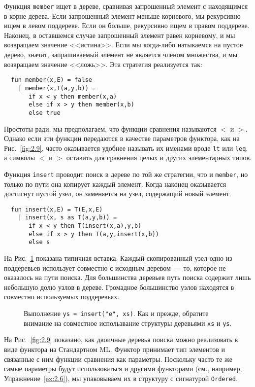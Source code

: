 Функция \lstinline!member! ищет в дереве, сравнивая запрошенный
элемент с находящимся в корне дерева. Если запрошенный элемент меньше
корневого, мы рекурсивно ищем в левом поддереве. Если он больше,
рекурсивно ищем в правом поддереве. Наконец, в оставшемся случае
запрошенный элемент равен корневому, и мы возвращаем значение
<<истина>>. Если мы когда-либо натыкаемся на пустое дерево, значит,
запрашиваемый элемент не является членом множества, и мы возвращаем
значение <<ложь>>.  Эта стратегия реализуется так:
\begin{lstlisting}
  fun member(x,E) = false
    | member(x,T(a,y,b)) =
       if x < y then member(x,a)
       else if x > y then member(x,b)
       else true
\end{lstlisting}
\begin{remark}
  Простоты ради, мы предполагаем, что функции сравнения называются $<$
  и $>$. Однако если эти функции передаются в качестве параметров
  функтора, как на Рис.~\ref{fig:2.9}, часто оказывается удобнее
  называть их именами вроде \lstinline!lt! или \lstinline!leq!, а
  символы $<$ и $>$ оставить для сравнения целых и других элементарных
  типов.
\end{remark}

Функция \lstinline!insert! проводит поиск в дереве по той же стратегии,
что и \lstinline!member!, но только по пути она копирует каждый
элемент. Когда наконец оказывается достигнут пустой узел, он
заменяется на узел, содержащий новый элемент.
\begin{lstlisting}
  fun insert(x,E) = T(E,x,E)
    | insert(x, s as T(a,y,b)) =
       if x < y then T(insert(x,a),y,b)
       else if x > y then T(a,y,insert(x,b))
       else s
\end{lstlisting}
На Рис.~\ref{fig:2.8} показана типичная вставка. Каждый скопированный
узел одно из поддеревьев использует совместно с исходным деревом~--- то,
которое не оказалось на пути поиска. Для большинства деревьев путь
поиска содержит лишь небольшую долю узлов в дереве. Громадное
большинство узлов находятся в совместно используемых поддеревьях.

\begin{figure}
  \centering

  \caption{Выполнение \lstinline!ys = insert("e", xs)!. Как и прежде,
    обратите внимание на совместное использвание структуры деревьями \lstinline!xs! и \lstinline!ys!.}
  \label{fig:2.8}
\end{figure}

На Рис.~\ref{fig:2.9} показано, как двоичные деревья поиска можно
реализовать в виде функтора на Стандартном ML. Функтор принимает тип
элементов и связанные с ним функции сравнения как параметры. Поскольку
часто те же самые параметры будут использоваться и другими функторами
(см., например, Упражнение~\ref{ex:2.6}), мы упаковываем их в
структуру с сигнатурой \lstinline!Ordered!.

